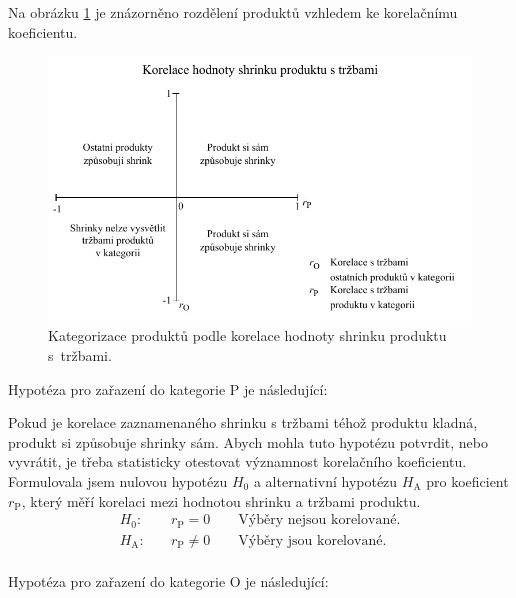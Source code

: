 Na obrázku \ref*{obr:ctg:g:kategorizace1} je znázorněno rozdělení produktů vzhledem ke korelačnímu koeficientu. 

\begin{figure}[hbtp!]
    \centering
    \captionsetup{justification=centering}
    \includegraphics[width=\textwidth]{obrazky/grafy/matice_korelace_typy_DP-graf.pdf}
    \caption{Kategorizace produktů podle korelace hodnoty shrinku produktu s~tržbami.}
    \label{obr:ctg:g:kategorizace1}
\end{figure}

Hypotéza pro zařazení do kategorie P je následující:

Pokud je korelace zaznamenaného shrinku s tržbami téhož produktu kladná, produkt si způsobuje shrinky sám.
Abych mohla tuto hypotézu potvrdit, nebo vyvrátit, je třeba statisticky otestovat významnost korelačního koeficientu. Formulovala jsem nulovou hypotézu $H_\mathrm{0}$ a alternativní hypotézu $H_\mathrm{A}$ pro koeficient $r_\mathrm{P}$, který měří korelaci mezi hodnotou shrinku a tržbami produktu.
\begin{equation*}
    \begin{aligned}
        H_\mathrm{0}: \quad & r_\mathrm{P} = 0 \qquad \mbox{Výběry nejsou korelované.}  \\
        H_\mathrm{A}: \quad & r_\mathrm{P} \neq 0 \qquad\mbox{Výběry jsou korelované.}\\
    \end{aligned}
\end{equation*}

Hypotéza pro zařazení do kategorie O je následující:

